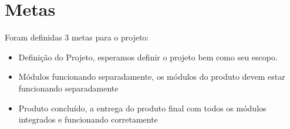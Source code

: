 \chapter[Metas]{Metas}

Foram definidas 3 metas para o projeto:

\begin{itemize}
\item Definição do Projeto, esperamos definir o projeto bem como seu escopo.
\item Módulos funcionando separadamente, os módulos do produto devem estar funcionando separadamente
\item Produto concluído, a entrega do produto final com todos os módulos integrados e funcionando corretamente
\end{itemize}
